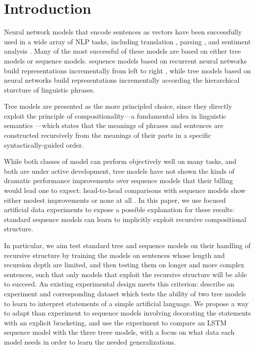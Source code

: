 \section{Introduction}\label{sec:intro}

Neural network models that encode sentences as vectors have been successfully used in a wide array of NLP tasks, including translation \cite{sutskever2014sequence}, parsing \cite{dyer2015transition}, and sentiment analysis \cite{tai2015improved}. Many of the most successful of these models are based on either tree models or sequence models. sequence models based on recurrent neural networks build representations incrementally from left to right \cite{elman1990finding,sutskever2014sequence}, while tree models based on  neural networks \cite{goller1996learning,socher2011semi} build representations incrementally according the hierarchical sturcture of linguistic phrases.

Tree models are presented as the more principled choice, since they directly exploit the principle of compositionality---a fundamental idea in linguistic semantics \cite{Partee84,Janssen97}---which states that the meanings of phrases and sentences are constructed recursively from the meanings of their parts in a specific syntactically-guided order.

While both classes of model can perform objectively well on many tasks, and both are under active development, tree models have not shown the kinds of dramatic performance improvements over sequence models that their billing would lead one to expect: head-to-head comparisons with sequence models show either modest improvements \cite{tai2015improved} or none at all \cite{li2015tree}. 
In this paper, we use focused artificial data experiments to expose a possible explanation for these results: standard sequence models can learn to implicitly exploit recursive compositional structure.

In particular, we aim test standard tree and sequence models on their handling of recursive structure by training the models on sentences whose length and recursion depth are limited, and then testing them on longer and more complex sentences, such that only models that exploit the recursive structure will be able to succeed. An existing experimental design meets this criterion:  describe an experiment and corresponding dataset which tests the ability of two tree models to learn to interpret statements of a simple artificial language. We propose a way to adapt than experiment to sequence models involving decorating the statements with an explicit bracketing, and use the experiment to compare an LSTM sequence model with the three treee models, with a focus on what data each model needs in order to learn the needed generalizations.

